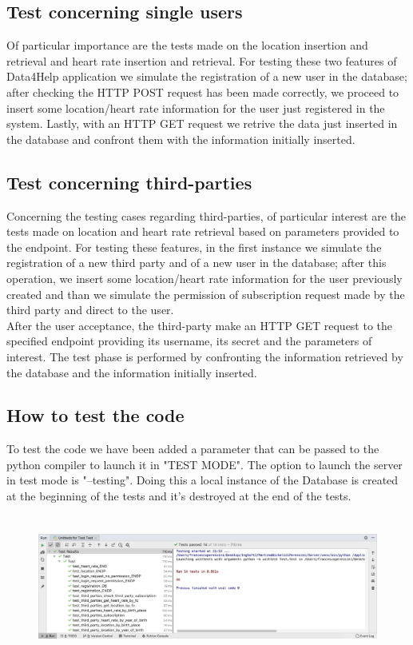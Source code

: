 \documentclass{article}
\begin{document}
\subsection{Test concerning single users}
Of particular importance are the tests made on the location insertion and retrieval and heart rate insertion and retrieval.
For testing these two features of Data4Help application we simulate the registration of a new user in the database; after checking the HTTP POST request has been made correctly, we proceed to insert some location/heart rate information for the user just registered in the system. Lastly, with an HTTP GET request we retrive the data just inserted in the database and confront them with the information initially inserted.

\subsection{Test concerning third-parties}
Concerning the testing cases regarding third-parties, of particular interest are the tests made on location and heart rate retrieval based on parameters provided to the endpoint.
For testing these features, in the first instance we simulate the registration of a new third party and of a new user in the database; after this operation, we insert some location/heart rate information for the user previously created and than we simulate the permission of subscription request made by the third party and direct to the user. \\
After the user acceptance, the third-party make an HTTP GET request to the specified endpoint providing its username, its secret and the parameters of interest.
The test phase is performed by confronting the information retrieved by the database and the information initially inserted.  
\newpage
\subsection{How to test the code}
To test the code we have been added a parameter that can be passed to the python compiler to launch it in "TEST MODE".
The option to launch the server in test mode is "--testing". Doing this a local instance of the Database is created at the beginning of the tests and it's destroyed at the end of the tests.

\begin{figure}[h!]
\centering
	\includegraphics[height=4.7cm,keepaspectratio]{Figures/tests}
\end{figure}
\end{document}

